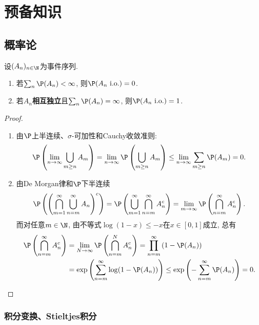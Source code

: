 \section{预备知识}

\subsection{概率论}

\begin{theorem}
	设$(A_n)_{n \in \N}$为事件序列.
	\begin{enumerate}
		\item 若$\sum_n \P(A_n) < \infty$, 则$\P(A_n \text{ i.o.} ) =0$. 
		\item 若$A_n$\textbf{相互独立}且$\sum_n \P(A_n) = \infty$, 则$\P(A_n \text{ i.o.} ) =1$.
	\end{enumerate}
\end{theorem}
\begin{proof}
	\begin{enumerate}
		\item 由$\P$上半连续、$\sigma$-可加性和Cauchy收敛准则: 
		\begin{equation*} 
			\P\left(\lim_{n \to \infty} \bigcup_{m \geq n} A_m\right) 
			= \lim_{n \to \infty} \P \left(\bigcup_{m \geq n} A_m\right) 
			\leq \lim_{n \to \infty} \sum_{m \geq n} \P(A_m) = 0. 
		\end{equation*}
		\item 由De Morgan律和$\P$下半连续
		\begin{equation*}
			\P \left( \left(\bigcap_{m=1}^{\infty} \bigcup_{n=m}^{\infty} A_n \right)^c \right)
			= \P \left( \bigcup_{m=1}^{\infty} \bigcap_{n=m}^{\infty} A_n^c \right) 
			= \lim_{m \to \infty} \P\left( \bigcap_{n=m}^{\infty} A_n^c \right).
		\end{equation*}
		而对任意$m \in \N$, 由不等式$\log(1-x) \leq -x$在$x \in [0,1]$成立, 总有
		\begin{align*}
			\P \left( \bigcap_{n=m}^{\infty} A_n^c \right) 
			&= \lim_{N \to \infty} \P \left( \bigcap_{n=m}^{N} A_n^c \right) 
			= \prod_{n=m}^{\infty} \left( 1 - \P(A_n) \right) \\
			&= \exp\left( \sum_{n=m}^{\infty} \log(1-\P(A_n)) \right)
			\leq \exp\left(- \sum_{n=m}^{\infty} \P(A_n) \right) 
			= 0. 
		\end{align*}
	\end{enumerate}
\end{proof}


\subsubsection{积分变换、Stieltjes积分}


